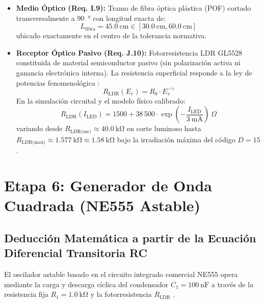 \documentclass[11pt,letterpaper]{article}
\begin{document}
\begin{itemize}
    \item \textbf{Medio Óptico (Req. I.9):} Tramo de fibra óptica plástica (POF) cortado transversalmente a \SI{90}{\degree} con longitud exacta de:
    \begin{equation}
    L_{\text{fibra}} = \SI{45.0}{\centi\meter} \in [\SI{30.0}{\centi\meter}, \SI{60.0}{\centi\meter}]
    \end{equation}
    ubicado exactamente en el centro de la tolerancia normativa.
    \item \textbf{Receptor Óptico Pasivo (Req. J.10):} Fotorresistencia LDR GL5528 constituida de material semiconductor pasivo (sin polarización activa ni ganancia electrónica interna). La resistencia superficial responde a la ley de potencias fenomenológica \cite{rose1963}:
    \begin{equation}
    R_{\text{LDR}}(E_v) = R_0 \cdot E_v^{-\gamma}
    \label{eq:ldr_fotometria}
    \end{equation}
    En la simulación circuital y el modelo físico calibrado:
    \begin{equation}
    R_{\text{LDR}}(I_{\text{LED}}) = 1500 + 38\,500 \cdot \exp\left( -\frac{I_{\text{LED}}}{\SI{3}{\milli\ampere}} \right)\ \Omega
    \label{eq:ldr_modelo_spice}
    \end{equation}
    variando desde $R_{\text{LDR(osc)}} \approx \SI{40.0}{\kilo\ohm}$ en corte luminoso hasta $R_{\text{LDR(max)}} \approx \SI{1.577}{\kilo\ohm} \approx \SI{1.58}{\kilo\ohm}$ bajo la irradiación máxima del código $D=15$.
\end{itemize}

\section{Etapa 6: Generador de Onda Cuadrada (NE555 Astable)}

\subsection{Deducción Matemática a partir de la Ecuación Diferencial Transitoria RC}
El oscilador astable basado en el circuito integrado comercial NE555 opera mediante la carga y descarga cíclica del condensador $C_1 = \SI{100}{\nano\farad}$ a través de la resistencia fija $R_1 = \SI{1.0}{\kilo\ohm}$ y la fotorresistencia $R_{\text{LDR}}$ \cite{camenzind2005,ti_ne555}.
\end{document}
